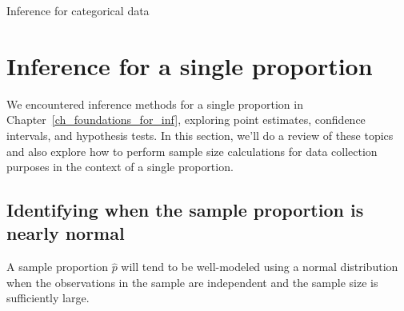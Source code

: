 \begin{chapterpage}{Inference for categorical data}
  \label{inferenceForCategoricalData}
  \label{ch_inference_for_props}
\end{chapterpage}
\renewcommand{\chapterfolder}{ch_inference_for_props}



\section{Inference for a single proportion}
\label{singleProportion}

We encountered inference methods for a single proportion
in Chapter~\ref{ch_foundations_for_inf},
exploring point estimates, confidence intervals,
and hypothesis tests.
In this section, we'll do a review of these topics
and also explore how to perform sample size calculations
for data collection purposes in the context of a single
proportion.


\subsection{Identifying when the sample proportion is nearly normal}

A sample proportion $\hat{p}$ will tend to be well-modeled
using a normal distribution when the observations in the
sample are independent and the sample size is sufficiently
large.




